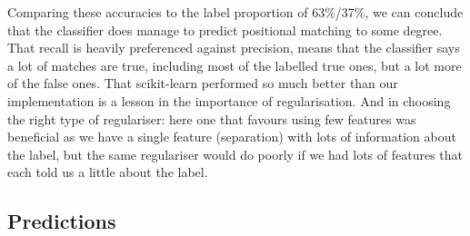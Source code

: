 \documentclass[12pt,a4paper]{article}
\begin{document}
Comparing these accuracies to the label proportion of 63\%/37\%, we can conclude that the classifier does manage to predict positional matching to some degree. That recall is heavily preferenced against precision, means that the classifier says a lot of matches are true, including most of the labelled true ones, but a lot more of the false ones.
That scikit-learn performed so much better than our implementation is a lesson in the importance of regularisation. And in choosing the right type of regulariser: here one that favours using few features was beneficial as we have a single feature (separation) with lots of information about the label, but the same regulariser would do poorly if we had lots of features that each told us a little about the label.\\

\subsection{Predictions}
\end{document}
